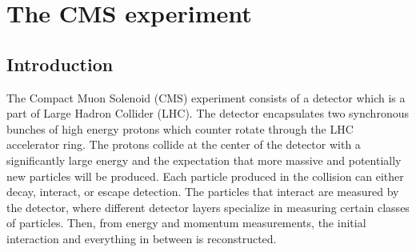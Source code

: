 \setcounter{secnumdepth}{3}
\setcounter{tocdepth}{3}
\setlength{\parskip}{\smallskipamount}
\setlength{\parindent}{0pt}


\makeatletter


\providecommand{\tabularnewline}{\\}


\makeatother


\chapter{The CMS experiment}

\section{Introduction} The Compact Muon Solenoid (CMS) experiment consists of a detector which is a part of Large Hadron Collider (LHC). The detector encapsulates two synchronous bunches of high energy protons  which counter rotate through the LHC accelerator ring.  The protons collide at the center of the detector with a significantly large energy and the expectation that more massive and potentially new particles will be produced. Each particle produced in the collision can either decay, interact, or escape detection. The particles that interact are measured by the detector, where different detector layers specialize in measuring certain classes of particles. Then, from energy and momentum measurements, the initial interaction and everything in between is reconstructed.   



